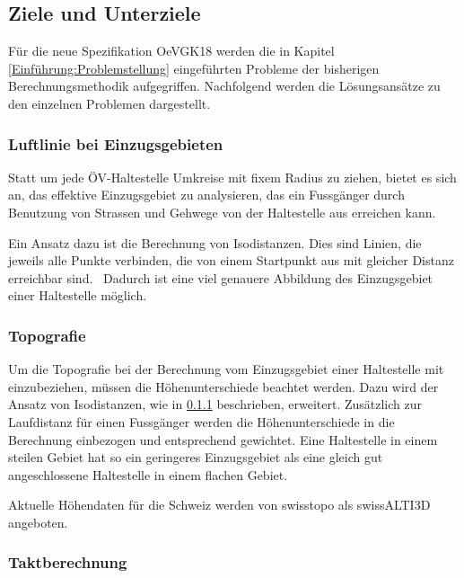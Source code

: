\subsection{Ziele und Unterziele}
\label{Einführung:Ziele und Unterziele}

Für die neue Spezifikation \gls{OeVGK18} werden die in Kapitel \ref{Einführung:Problemstellung} eingeführten Probleme der bisherigen Berechnungsmethodik aufgegriffen.
Nachfolgend werden die Lösungsansätze zu den einzelnen Problemen dargestellt.


\subsubsection{Luftlinie bei Einzugsgebieten}
\label{solution:Luftlinie bei Einzugsgebieten}

Statt um jede \acs{ÖV}-Haltestelle Umkreise mit fixem Radius zu ziehen, bietet es sich an, das effektive Einzugsgebiet zu analysieren, das ein Fussgänger durch Benutzung von Strassen und Gehwege von der Haltestelle aus erreichen kann.

Ein Ansatz dazu ist die Berechnung von Isodistanzen.
Dies sind Linien, die jeweils alle Punkte verbinden, die von einem Startpunkt aus mit gleicher Distanz erreichbar sind.~\cite{isodistance_gislounge}
Dadurch ist eine viel genauere Abbildung des Einzugsgebiet einer Haltestelle möglich.


\subsubsection{Topografie}
\label{solution:Topografie}

Um die Topografie bei der Berechnung vom Einzugsgebiet einer Haltestelle mit einzubeziehen, müssen die Höhenunterschiede beachtet werden.
Dazu wird der Ansatz von Isodistanzen, wie in \ref{solution:Luftlinie bei Einzugsgebieten} beschrieben, erweitert. Zusätzlich zur Laufdistanz für einen Fussgänger werden die Höhenunterschiede in die Berechnung einbezogen und entsprechend gewichtet.
Eine Haltestelle in einem steilen Gebiet hat so ein geringeres Einzugsgebiet als eine gleich gut angeschlossene Haltestelle in einem flachen Gebiet.

Aktuelle Höhendaten für die Schweiz werden von swisstopo als swissALTI3D angeboten.~\cite{swissalti3d_swisstopo}

\subsubsection{Taktberechnung}
\label{solution:Taktberechnung}


